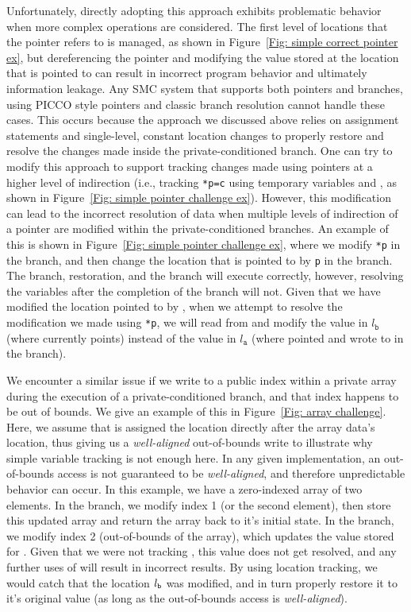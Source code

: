 Unfortunately, directly adopting this approach exhibits problematic behavior when more complex operations are considered.
The first level of locations that the pointer refers to is managed, as shown in Figure~\ref{Fig: simple correct pointer ex}, but dereferencing the pointer and modifying the value stored at the location that is pointed to can result in incorrect program behavior and ultimately information leakage. 
Any SMC system that supports both pointers and branches, using PICCO style pointers and classic branch resolution cannot handle these cases.
This occurs because the approach we discussed above relies on assignment statements and single-level, constant location changes to properly restore and resolve the changes made inside the private-conditioned branch. 
One can try to modify this approach to support tracking changes made using pointers at a higher level of indirection  (i.e., tracking \texttt{*p=c} using temporary variables  and , as shown in Figure~\ref{Fig: simple pointer challenge ex}). 
However, this modification can lead to the incorrect resolution of data when multiple levels of indirection of a pointer are modified within the private-conditioned branches. 
An example of this is shown in Figure~\ref{Fig: simple pointer challenge ex}, where we modify \texttt{*p} in the  branch, and then change the location that is pointed to by \texttt{p} in the  branch. 
The  branch, restoration, and the  branch will execute correctly, however, resolving the variables after the completion of the  branch will not. 
Given that we have modified the location pointed to by , when we attempt to resolve the modification we made using \texttt{*p}, we will read from and modify the value in $l_\texttt{b}$ (where  currently points) instead of the value in $l_\texttt{a}$ (where  pointed and wrote to in the  branch).


We encounter a similar issue if we write to a public index within a private array during the execution of a private-conditioned branch, and that index happens to be out of bounds. 
We give an example of this in Figure~\ref{Fig: array challenge}. Here, we assume that  is assigned the location directly after the array data's location, thus giving us a \emph{well-aligned} out-of-bounds write to illustrate why simple variable tracking is not enough here. 
In any given implementation, an out-of-bounds access is not guaranteed to be \emph{well-aligned}, and therefore unpredictable behavior can occur. 
In this example, we have a zero-indexed array  of two elements. In the  branch, we modify index 1 (or the second element), then store this updated array and return the array back to it's initial state. 
In the  branch, we modify index 2 (out-of-bounds of the array), which updates the value stored for . Given that we were not tracking , this value does not get resolved, and any further uses of  will result in incorrect results. 
By using location tracking, we would catch that the location $l_{\texttt{b}}$ was modified, and in turn properly restore it to it's original value (as long as the out-of-bounds access is \emph{well-aligned}).


